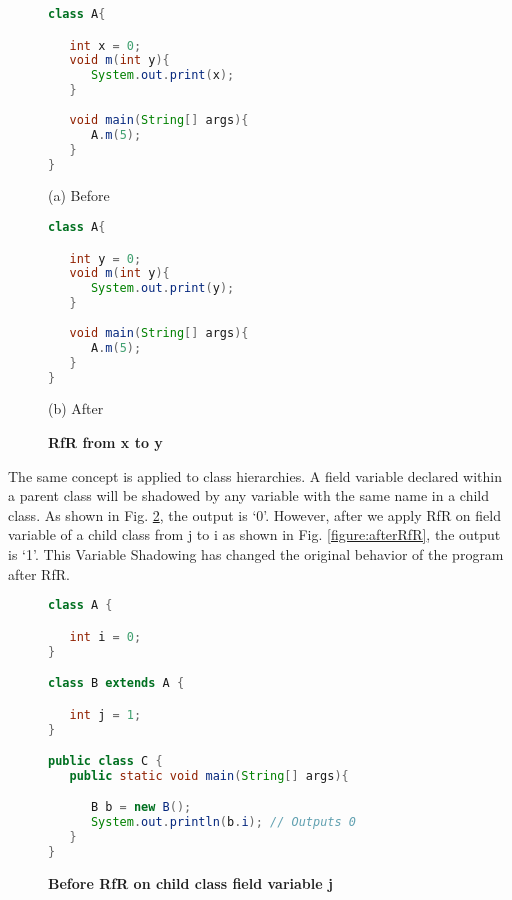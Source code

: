 \begin{figure}[th]
\centering
\begin{minipage}[t]{0.45\linewidth}
\begin{lstlisting}[language=java, basicstyle=\scriptsize\ttfamily,frame=single]
class A{

   int x = 0;
   void m(int y){
      System.out.print(x);
   }
	
   void main(String[] args){
      A.m(5);
   }
}

\end{lstlisting}
\centering(a) Before
\end{minipage}
\hfill
\begin{minipage}[t]{0.45\linewidth}
\begin{lstlisting}[language=java, basicstyle=\scriptsize\ttfamily,frame=single]
class A{

   int y = 0;
   void m(int y){
      System.out.print(y);
   }
	
   void main(String[] args){
      A.m(5);
   }
}\end{lstlisting}
\centering(b) After
\end{minipage}
\caption{\textbf{RfR from x to y}}
\label{figure:sameBlock}
\end{figure}

The same concept is applied to class hierarchies. A field variable declared within a parent class will be shadowed by any variable with the same name in a child class. As shown in Fig. \ref{figure:beforeRfR}, the output is `0'. However, after we apply RfR on field variable of a child class from j to i as shown in Fig. \ref{figure:afterRfR}, the output is `1'. This Variable Shadowing has changed the original behavior of the program after RfR. 

\begin{figure}[th]
\centering
\begin{minipage}[t]{0.75\linewidth}
\begin{lstlisting}[language=java, basicstyle=\scriptsize\ttfamily,frame=single]
class A {

   int i = 0;
}

class B extends A {

   int j = 1; 
}

public class C {
   public static void main(String[] args){

      B b = new B();
      System.out.println(b.i); // Outputs 0
   }
}
\end{lstlisting}
\end{minipage}
\caption{\textbf{Before RfR on child class field variable j}}
\label{figure:beforeRfR}
\end{figure}

